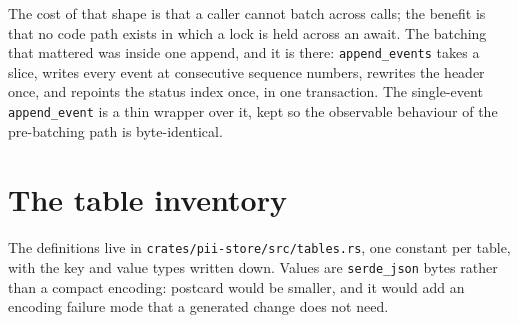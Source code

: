 \begin{center}
\end{center}

The cost of that shape is that a caller cannot batch across calls; the benefit is that no code
path exists in which a lock is held across an await. The batching that mattered was inside one
append, and it is there: \texttt{append\_events} takes a slice, writes every event at
consecutive sequence numbers, rewrites the header once, and repoints the status index once, in
one transaction. The single-event \texttt{append\_event} is a thin wrapper over it, kept so
the observable behaviour of the pre-batching path is byte-identical.

\section{The table inventory}

The definitions live in \texttt{crates/pii-store/src/tables.rs}, one constant per table, with
the key and value types written down. Values are \texttt{serde\_json} bytes rather than a
compact encoding: postcard would be smaller, and it would add an encoding failure mode that a
generated change does not need.

